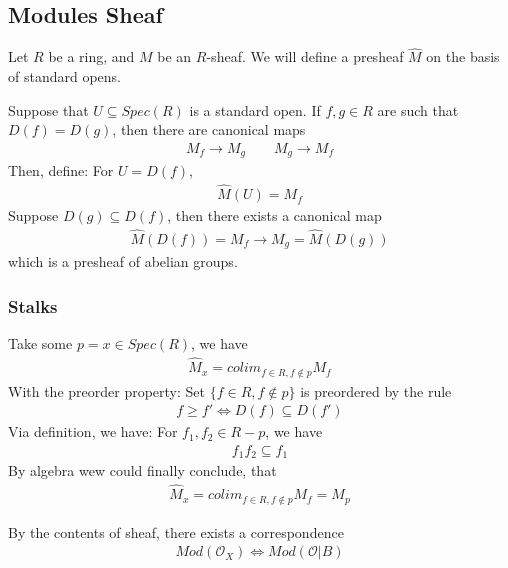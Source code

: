 \documentclass[Total.tex]{subfiles}
\begin{document}
			\subsection{Modules Sheaf}
			
			\begin{Def}
				Let $R$ be a ring, and $M$ be an $R$-sheaf. We will define a presheaf $\hat{M}$ on the basis of standard opens.
				
				Suppose that $U\subseteq Spec(R)$ is a standard open. If $f,g\in R$ are such that $D(f)=D(g)$, then there are canonical maps
				\begin{gather*}
					M_f\rightarrow M_g\qquad M_g\rightarrow M_f
				\end{gather*}
				Then, define: For $U=D(f)$,
				\begin{gather*}
					\hat{M}(U)=M_f
				\end{gather*}
				Suppose $D(g)\subseteq D(f)$, then there exists a canonical map
				\begin{gather*}
					\hat{M}(D(f))=M_f\rightarrow M_g=\hat{M}(D(g))
				\end{gather*}
				which is a presheaf of abelian groups.
			\end{Def}
			
			\subsubsection{Stalks}
				Take some $p=x\in Spec(R)$, we have
				\begin{gather*}
					\hat{M}_x=colim_{f\in R,f\notin p} M_f
				\end{gather*}
				With the preorder property: Set $\{f\in R,f\notin p\}$ is preordered by the rule
				\begin{gather*}
					f\geq f'\Leftrightarrow D(f)\subseteq D(f')
				\end{gather*}
				Via definition, we have: For $f_1,f_2\in R-p$, we have
				\begin{gather*}
					f_1f_2\subseteq f_1
				\end{gather*}
				By algebra wew could finally conclude, that
				\begin{gather*}
					\hat{M}_x=colim_{f\in R,f\notin p} M_f=M_p
				\end{gather*}
				
				By the contents of sheaf, there exists a correspondence
				\begin{gather*}
					Mod(\mathcal{O}_X)\Leftrightarrow Mod(\mathcal{O}|B)
				\end{gather*}
				
\end{document}
